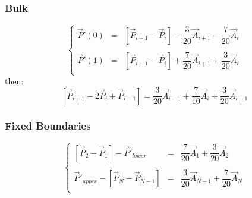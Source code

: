 \documentclass[aps,12pt]{revtex4}
\begin{document}
\subsubsection{Bulk}

\begin{equation}
\left\lbrace
\begin{array}{rcl}
	\vec{P}'(0) & = & \left[\vec{P}_{i+1}-\vec{P}_i\right] - \dfrac{3}{20} \vec{A}_{i+1} - \dfrac{7}{20}\vec{A}_{i} \\
	\\
	\vec{P}'(1) & = & \left[\vec{P}_{i+1}-\vec{P}_i\right] + \dfrac{7}{20} \vec{A}_{i+1} + \dfrac{3}{20}\vec{A}_{i}\\
\end{array}
\right.
\end{equation}
then:
\begin{equation}
	 \left[\vec{P}_{i+1}-2\vec{P}_i+\vec{P}_{i-1}\right] = \dfrac{3}{20} \vec{A}_{i-1} + \dfrac{7}{10}\vec{A}_{i} + \dfrac{3}{20} \vec{A}_{i+1}
\end{equation}

\subsubsection{Fixed Boundaries}
 
\begin{equation}
\left\lbrace
\begin{array}{rcl}
 	 \left[\vec{P}_{2}-\vec{P}_1\right] - \vec{P}'_{lower}& = &\dfrac{7}{20} \vec{A}_1 + \dfrac{3}{20} \vec{A}_{2}\\
	 \\
	\vec{P}'_{upper} - \left[\vec{P}_N - \vec{P}_{N-1}\right] & = & \dfrac{3}{20} \vec{A}_{N-1} + \dfrac{7}{20} \vec{A}_{N}\\
\end{array}
\right.
\end{equation}
\end{document}
